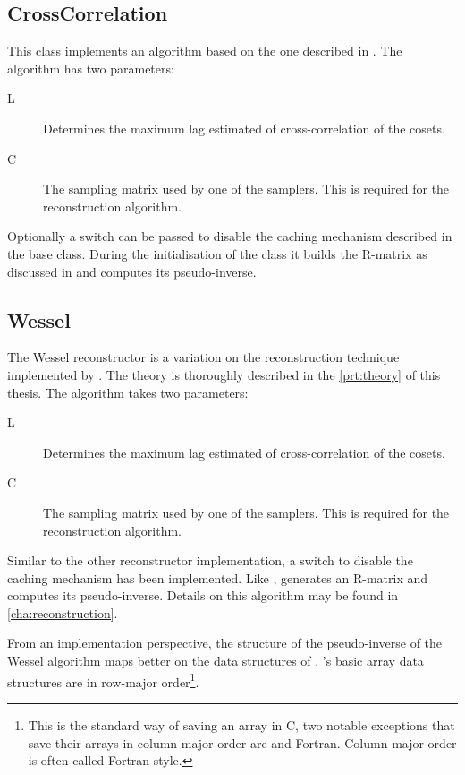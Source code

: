 \documentclass[a4paper, openany, oneside]{memoir}
\begin{document}
\subsection{CrossCorrelation}
\label{sub:crosscorrelation}
This class implements an algorithm based on the one described in \cite{ariananda2012compressive}. The algorithm has two parameters:
\begin{description}
    \item[L] Determines the maximum lag estimated of cross-correlation of the cosets.
    \item[C] The sampling matrix used by one of the samplers. This is required for the reconstruction algorithm.
\end{description}
Optionally a switch can be passed to disable the caching mechanism described in the base class. During the initialisation of the class it builds the R-matrix as discussed in \cite{ariananda2012compressive} and computes its pseudo-inverse.

\subsection{Wessel}
\label{sub:wessel}
The Wessel reconstructor is a variation on the reconstruction technique implemented by . The theory is thoroughly described in the \cref{prt:theory} of this thesis. The algorithm takes two parameters:
\begin{description}
    \item[L] Determines the maximum lag estimated of cross-correlation of the cosets.
    \item[C] The sampling matrix used by one of the samplers. This is required for the reconstruction algorithm.
\end{description}
Similar to the other reconstructor implementation, a switch to disable the caching mechanism has been implemented. Like ,  generates an R-matrix and computes its pseudo-inverse. Details on this algorithm may be found in \cref{cha:reconstruction}.

From an implementation perspective, the structure of the pseudo-inverse of the Wessel algorithm maps better on the data structures of . 's basic array data structures are in row-major order\footnote{This is the standard way of saving an array in C, two notable exceptions that save their arrays in column major order are \matlab{} and Fortran. Column major order is often called Fortran style.}.
\end{document}
